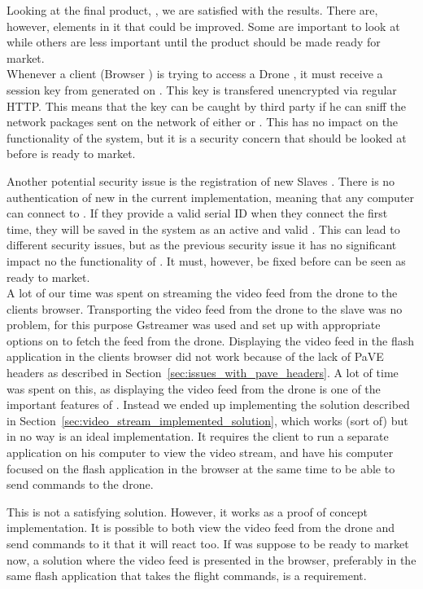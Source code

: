Looking at the final product, \projectname{}, we are satisfied with the results. 
There are, however, elements in it that could be improved. 
Some are important to look at while others are less important until the product should be made ready for market. \\

Whenever a client (Browser ) is trying to access a Drone , it must receive a session key from  generated on .
This key is transfered unencrypted via regular HTTP. 
This means that the key can be caught by third party if he can sniff the network packages sent on the network of either  or . 
This has no impact on the functionality of the system, but it is a security concern that should be looked at before \projectname{} is ready to market.

Another potential security issue is the registration of new Slaves .
There is no authentication of new  in the current implementation, meaning that any computer can connect to .
If they provide a valid serial ID when they connect the first time, they will be saved in the system as an active and valid . 
This can lead to different security issues, but as the previous security issue it has no significant impact no the functionality of \projectname{}.
It must, however, be fixed before \projectname{} can be seen as ready to market. \\

A lot of our time was spent on streaming the video feed from the drone to the clients browser. 
Transporting the video feed from the drone to the slave  was no problem, for this purpose Gstreamer was used and set up with appropriate options on  to fetch the feed from the drone. 
Displaying the video feed in the flash application in the clients browser did not work because of the lack of PaVE headers as described in Section~\ref{sec:issues_with_pave_headers}.
A lot of time was spent on this, as displaying the video feed from the drone is one of the important features of \projectname{}. 
Instead we ended up implementing the solution described in Section~\ref{sec:video_stream_implemented_solution}, which works (sort of) but in no way is an ideal implementation.
It requires the client to run a separate application on his computer to view the video stream, and have his computer focused on the flash application in the browser at the same time to be able to send commands to the drone. 

This is not a satisfying solution.
However, it works as a proof of concept implementation. 
It is possible to both view the video feed from the drone and send commands to it that it will react too. 
If \projectname{} was suppose to be ready to market now, a solution where the video feed is presented in the browser, preferably in the same flash application that takes the flight commands, is a requirement. 

